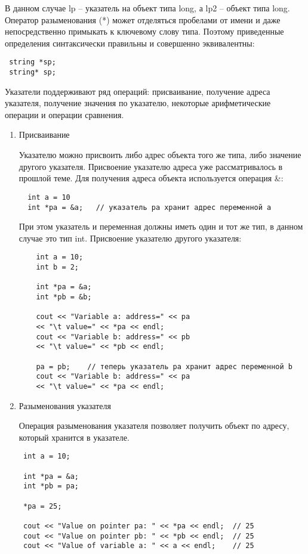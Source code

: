 \documentclass[a4paper,report,14pt]{ncc}
\begin{document}
В данном случае lp -- указатель на объект типа long, а lp2 -- объект типа long. Оператор разыменования (*) может отделяться пробелами от имени и даже непосредственно примыкать к ключевому слову типа. Поэтому приведенные определения синтаксически правильны и совершенно эквивалентны:

\begin{verbatim}
 string *sp;
 string* sp;
\end{verbatim}

Указатели поддерживают ряд операций: присваивание, получение адреса указателя, получение значения по указателю, некоторые арифметические операции и операции сравнения.

\begin{enumerate}
 \item Присваивание
 
 Указателю можно присвоить либо адрес объекта того же типа, либо значение другого указателя. Присвоение указателю адреса уже рассматривалось в прошлой теме. Для получения адреса объекта используется операция \&:
 \begin{verbatim}
  int a = 10
  int *pa = &a;   // указатель pa хранит адрес переменной a
 \end{verbatim}

 При этом указатель и переменная должны иметь один и тот же тип, в данном случае это тип int. Присвоение указателю другого указателя:
 \begin{verbatim}
    int a = 10;
    int b = 2;
      
    int *pa = &a;
    int *pb = &b;
      
    cout << "Variable a: address=" << pa 
    << "\t value=" << *pa << endl;
    cout << "Variable b: address=" << pb 
    << "\t value=" << *pb << endl;
      
    pa = pb;    // теперь указатель pa хранит адрес переменной b
    cout << "Variable b: address=" << pa 
    << "\t value=" << *pa << endl;
 \end{verbatim}
\item Разыменования указателя

Операция разыменования указателя позволяет получить объект по адресу, который хранится в указателе.

\begin{verbatim}
 int a = 10;
      
 int *pa = &a;
 int *pb = pa;
      
 *pa = 25;
      
 cout << "Value on pointer pa: " << *pa << endl;  // 25
 cout << "Value on pointer pb: " << *pb << endl;  // 25
 cout << "Value of variable a: " << a << endl;    // 25
\end{verbatim}


\end{enumerate}
\end{document}
